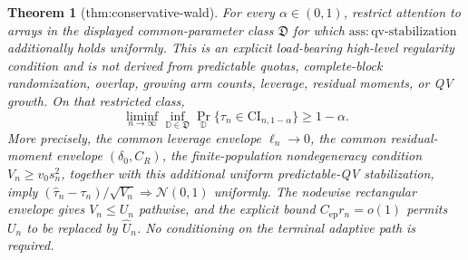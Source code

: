 \documentclass{article}
\newtheorem{theorem}{Theorem}
\begin{document}
\begin{theorem}[thm:conservative-wald]\label{thm:conservative-wald}
For every \(\alpha\in(0,1)\), restrict attention to arrays in the displayed common-parameter class \(\mathfrak D\) for which \(\mathrm{ass:qv\text{-}stabilization}\) additionally holds uniformly. This is an explicit load-bearing high-level regularity condition and is not derived from predictable quotas, complete-block randomization, overlap, growing arm counts, leverage, residual moments, or QV growth. On that restricted class, \[\liminf_{n\to\infty}\inf_{\mathbb D\in\mathfrak D}\Pr_{\mathbb D}\{\tau_n\in\mathrm{CI}_{n,1-\alpha}\}\ge1-\alpha.\] More precisely, the common leverage envelope \(\ell_n\to0\), the common residual-moment envelope \((\delta_0,C_R)\), the finite-population nondegeneracy condition \(V_n\ge v_0s_n^2\), together with this additional uniform predictable-QV stabilization, imply \((\widehat\tau_n-\tau_n)/\sqrt{V_n}\Rightarrow\mathcal N(0,1)\) uniformly. The nodewise rectangular envelope gives \(V_n\le U_n\) pathwise, and the explicit bound \(C_{\mathrm{ep}}r_n=o(1)\) permits \(U_n\) to be replaced by \(\widehat U_n\). No conditioning on the terminal adaptive path is required.
\end{theorem}
\end{document}

